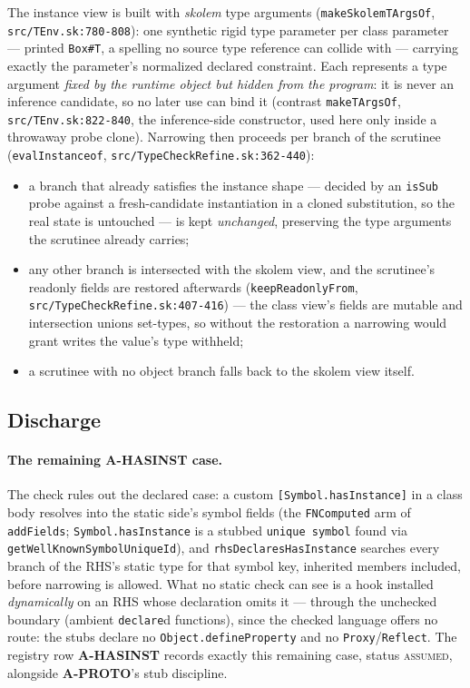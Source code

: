 \documentclass[11pt]{article}
\begin{document}
The instance view is built with \emph{skolem} type arguments
(\texttt{makeSkolemTArgsOf}, \texttt{src/TEnv.sk:780-808}): one
synthetic rigid type parameter per class parameter — printed
\texttt{Box\#T}, a spelling no source type reference can collide with —
carrying exactly the parameter's normalized declared constraint. Each
represents a type argument \emph{fixed by the runtime object but hidden
from the program}: it is never an inference candidate, so no later use
can bind it (contrast \texttt{makeTArgsOf},
\texttt{src/TEnv.sk:822-840}, the inference-side constructor, used here
only inside a throwaway probe clone). Narrowing then proceeds per
branch of the scrutinee (\texttt{evalInstanceof},
\texttt{src/TypeCheckRefine.sk:362-440}):
\begin{itemize}
\item a branch that already satisfies the instance shape — decided by
  an \texttt{isSub} probe against a fresh-candidate instantiation in a
  cloned substitution, so the real state is untouched — is kept
  \emph{unchanged}, preserving the type arguments the scrutinee already
  carries;
\item any other branch is intersected with the skolem view, and the
  scrutinee's readonly fields are restored afterwards
  (\texttt{keepReadonlyFrom},
  \texttt{src/TypeCheckRefine.sk:407-416}) — the class view's fields
  are mutable and intersection unions set-types, so without the
  restoration a narrowing would grant writes the value's type withheld;
\item a scrutinee with no object branch falls back to the skolem view
  itself.
\end{itemize}

\subsection{Discharge}

\paragraph{The remaining A-HASINST case.}
The check rules out the declared case: a custom
\texttt{[Symbol.hasInstance]} in a class body resolves into the static
side's symbol fields (the \texttt{FNComputed} arm of
\texttt{addFields}; \texttt{Symbol.hasInstance} is a stubbed
\texttt{unique symbol} found via
\texttt{getWellKnownSymbolUniqueId}), and
\texttt{rhsDeclaresHasInstance} searches every branch of the RHS's
static type for that symbol key, inherited members included, before
narrowing is allowed. What no static check can see is a hook installed
\emph{dynamically} on an RHS whose declaration omits it — through the
unchecked boundary (ambient \texttt{declare}d functions), since the
checked language offers no route: the stubs declare no
\texttt{Object.defineProperty} and no \texttt{Proxy}/\texttt{Reflect}.
The registry row \textbf{A-HASINST} records exactly this remaining case,
status \textsc{assumed}, alongside \textbf{A-PROTO}'s stub discipline.
\end{document}
